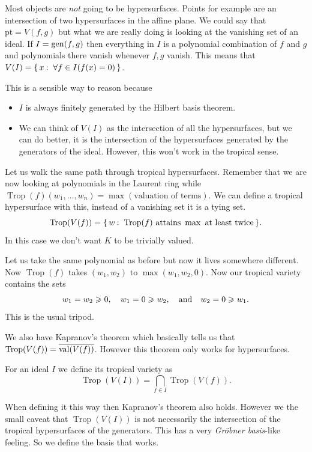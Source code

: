 \documentclass[12pt]{memoir}
\DeclareMathOperator{\val}{val}
\DeclareMathOperator{\Trop}{Trop}
\begin{document}
Most objects are \emph{not} going to be hypersurfaces. Points for example are an intersection of two hypersurfaces in the affine plane. We could say that $\text{pt}=V(f,g)$ but what we are really doing is looking at the vanishing set of an ideal. If $I=\operatorname{gen}(f,g)$ then everything in $I$ is a polynomial combination of $f$ and $g$ and polynomials there vanish whenever $f,g$ vanish.  This means that $V(I)=\set{x\:\ \forall f\in I(f(x)=0)}$.\par 
This is a sensible way to reason because 

\begin{itemize}
    \item $I$ is always finitely generated by the Hilbert basis theorem.
    \item We can think of $V(I)$ as the intersection of all the hypersurfaces, but we can do better, it is the intersection of the hypersurfaces generated by the generators of the ideal. However, this won't work in the tropical sense. 
\end{itemize}

Let us walk the same path through tropical hypersurfaces. Remember that we are now looking at polynomials in the Laurent ring while $\Trop(f)(w_1,\dots,w_n)=\max(\text{valuation of terms})$. We can define a tropical hypersurface with this, instead of a vanishing set it is a tying set. 
$$\Trop(V(f))=\set{w\:\ \Trop(f)\text{ attains }\max\text{ at least twice}}.$$
In this case we don't want $K$ to be trivially valued.

\begin{Ex}
    Let us take the same polynomial as before but now it lives somewhere different. Now $\Trop(f)$ takes $(w_1,w_2)$ to $\max(w_1,w_2,0)$. Now our tropical variety contains the sets 
    $$w_1=w_2\geqslant 0,\quad w_1=0\geqslant w_2,\quad\text{and}\quad w_2=0\geqslant w_1.$$
    This is the usual tripod.
\end{Ex}

We also have Kapranov's theorem which basically tells us that $\Trop(V(f))=\ov{\val(V(f))}$. However this theorem only works for hypersurfaces.

\begin{Def}
    For an ideal $I$ we define its tropical variety as 
    $$\Trop(V(I))=\bigcap_{f\in I}\Trop(V(f)).$$
\end{Def}

When defining it this way then Kapranov's theorem also holds. However we the small caveat that $\Trop(V(I))$ is not necessarily the intersection of the tropical hypersurfaces of the generators. This has a very \emph{Gr\"obner basis}-like feeling. So we define the basis that works. 
\end{document}
